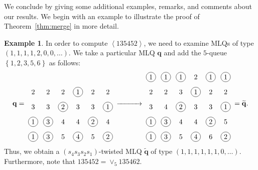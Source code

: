 \documentclass[reqno]{amsart}
\newcommand{\0}{\phantom{c}}
\newcommand{\swt}[1]{\left\langle #1 \right\rangle} %
\newcommand{\merge}[1]{\vee_{#1}} %
\newcommand{\qq}{\mathbf{q}}
\newcommand{\set}[1]{\left\{ #1 \right\}}
\theoremstyle{plain}
\theoremstyle{definition}
\newtheorem{example}[thm]{Example}
\numberwithin{equation}{section}
\begin{document}
We conclude by giving some additional examples, remarks, and comments about our results.
We begin with an example to illustrate the proof of Theorem~\ref{thm:merge} in more detail.

\begin{example}
\label{ex:merge_theorem}
In order to compute $\swt{135452}$, we need to examine MLQs of type $(1,1,1,1, 2, 0, 0, \ldots)$.
We take a particular MLQ $\qq$ and add the $5$-queue $\set{1,2,3,5,6}$ as follows:
\[
\qq = \;
\begin{tikzpicture}[baseline=66,scale=0.75,every node/.style={inner sep=2pt}]
\node at (0, 4){2};\node at (1, 4){2};\node at (2, 4){2};\node[circle, draw=black] at (3, 4){1};\node at (4, 4){2};\node at (5, 4){2};\node at (0, 3){3};\node at (1, 3){3};\node[circle, draw=black] at (2, 3){2};\node at (3, 3){3};\node at (4, 3){3};\node[circle, draw=black] at (5, 3){1};\node[circle, draw=black] at (0, 2){1};\node[circle, draw=black] at (1, 2){3};\node at (2, 2){4};\node at (3, 2){4};\node[circle, draw=black] at (4, 2){2};\node at (5, 2){4};\node[circle, draw=black] at (0, 1){1};\node[circle, draw=black] at (1, 1){3};\node at (2, 1){5};\node[circle, draw=black] at (3, 1){4};\node at (4, 1){5};\node[circle, draw=black] at (5, 1){2};
\end{tikzpicture}
\; \xrightarrow{\hspace{30pt}} \;
\begin{tikzpicture}[baseline=66,scale=0.75,every node/.style={inner sep=2pt}]
\node[circle, draw=black] at (0, 5){1};\node[circle, draw=black] at (1, 5){1};\node[circle, draw=black] at (2, 5){1};\node at (3, 5){2};\node[circle, draw=black] at (4, 5){1};\node[circle, draw=black] at (5, 5){1};\node at (0, 4){2};\node at (1, 4){2};\node at (2, 4){3};\node[circle, draw=black] at (3, 4){1};\node at (4, 4){2};\node at (5, 4){2};\node at (0, 3){3};\node at (1, 3){4};\node[circle, draw=black] at (2, 3){2};\node at (3, 3){3};\node at (4, 3){3};\node[circle, draw=black] at (5, 3){1};\node[circle, draw=black] at (0, 2){1};\node[circle, draw=black] at (1, 2){3};\node at (2, 2){4};\node at (3, 2){4};\node[circle, draw=black] at (4, 2){2};\node at (5, 2){5};\node[circle, draw=black] at (0, 1){1};\node[circle, draw=black] at (1, 1){3};\node at (2, 1){5};\node[circle, draw=black] at (3, 1){4};\node at (4, 1){6};\node[circle, draw=black] at (5, 1){2};
\end{tikzpicture}
\; = \widetilde{\qq}.
\]
Thus, we obtain a $(s_4 s_3 s_2 s_1)$-twisted MLQ $\widetilde{\qq}$ of type $(1, 1, 1, 1, 1, 1, 0, \ldots)$.
Furthermore, note that $135452 = \merge{5} 135462$.

\end{example}
\end{document}

